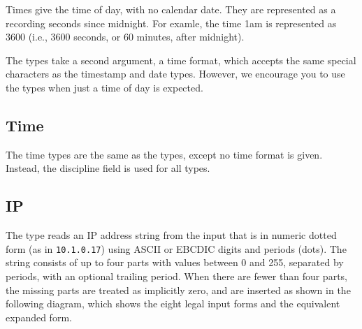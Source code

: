 \aedBegin{}
\aedEnd{}

Times give the time of day, with no calendar date.  They are
represented as a  recording seconds since midnight.  For
examle, the time 1am is represented as 3600 (i.e., 3600 seconds, or 60
minutes, after midnight).

The  types take a second argument, a time format, which
accepts the same special characters as the timestamp and date types.
However, we encourage you to use the  types when just a time of
day is expected.

\subsection{Time}

\aedBegin{}
\aedEnd{}

The time types are the same as the  types,
except no time format is given.  Instead, the \pads{}
discipline field  is used
for all  types.

\subsection{IP}

\aedBegin{}
\aedEnd{}

The  type reads an IP address string from the input that is in
numeric dotted form (as in {\tt 10.1.0.17}) using ASCII or EBCDIC
digits and periods (dots).  The string consists of up to four
parts with values between 0 and 255, separated by periods,
with an optional trailing period.  When there are
fewer than four parts, the missing parts are treated as implicitly
zero, and are inserted as shown in the following diagram,
which shows the eight legal input forms and the equivalent expanded form.

